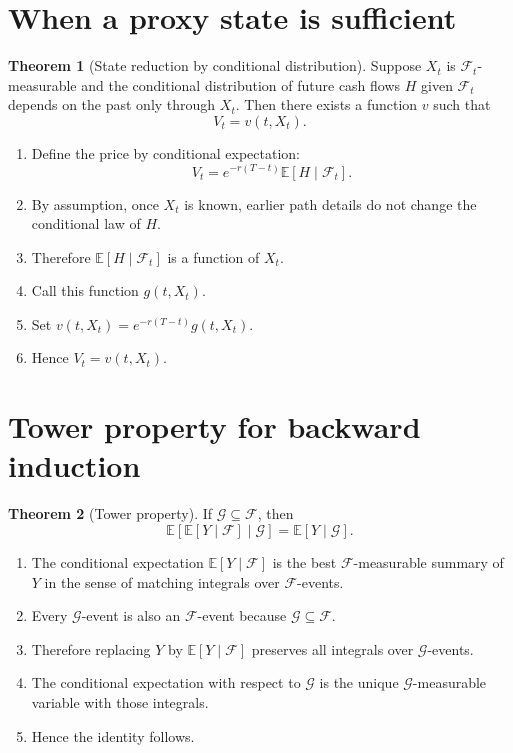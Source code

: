 \documentclass[11pt,oneside]{book}
\theoremstyle{definition}
\newtheorem{theorem}{Theorem}[chapter]
\newenvironment{proofsteps}
{\begin{enumerate}[label=\textbf{Line \arabic*.}, itemsep=0.35em]}
{\end{enumerate}}
\newcommand{\E}{\mathbb{E}}
\begin{document}
\section{When a proxy state is sufficient}
\begin{theorem}[State reduction by conditional distribution]
Suppose \(X_t\) is \(\mathcal F_t\)-measurable and the conditional distribution of future cash flows \(H\) given \(\mathcal F_t\) depends on the past only through \(X_t\). Then there exists a function \(v\) such that
\[
  V_t=v(t,X_t).
\]
\end{theorem}
\begin{proofsteps}
\item Define the price by conditional expectation:
\[
  V_t=e^{-r(T-t)}\E[H\mid\mathcal F_t].
\]
\item By assumption, once \(X_t\) is known, earlier path details do not change the conditional law of \(H\).
\item Therefore \(\E[H\mid\mathcal F_t]\) is a function of \(X_t\).
\item Call this function \(g(t,X_t)\).
\item Set \(v(t,X_t)=e^{-r(T-t)}g(t,X_t)\).
\item Hence \(V_t=v(t,X_t)\).
\end{proofsteps}

\section{Tower property for backward induction}
\begin{theorem}[Tower property]
If \(\mathcal G\subseteq\mathcal F\), then
\[
  \E[\E[Y\mid\mathcal F]\mid\mathcal G]=\E[Y\mid\mathcal G].
\]
\end{theorem}
\begin{proofsteps}
\item The conditional expectation \(\E[Y\mid\mathcal F]\) is the best \(\mathcal F\)-measurable summary of \(Y\) in the sense of matching integrals over \(\mathcal F\)-events.
\item Every \(\mathcal G\)-event is also an \(\mathcal F\)-event because \(\mathcal G\subseteq\mathcal F\).
\item Therefore replacing \(Y\) by \(\E[Y\mid\mathcal F]\) preserves all integrals over \(\mathcal G\)-events.
\item The conditional expectation with respect to \(\mathcal G\) is the unique \(\mathcal G\)-measurable variable with those integrals.
\item Hence the identity follows.
\end{proofsteps}
\end{document}
